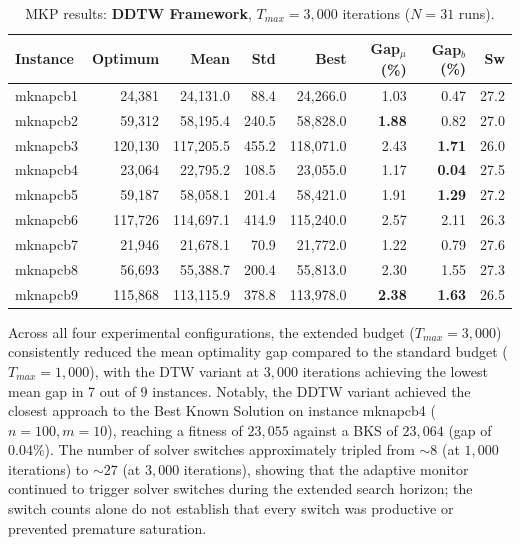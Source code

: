 \documentclass[review]{elsarticle}
\begin{document}
\begin{table}[htbp]
\centering
\caption{MKP results: \textbf{DDTW Framework}, $T_{max} = 3{,}000$ iterations ($N=31$ runs).}
\label{tab:mkp_ddtw_3k}
\begin{tabular}{lrrrrrrr}
\toprule
\textbf{Instance} & \textbf{Optimum} & \textbf{Mean} & \textbf{Std} & \textbf{Best} & \textbf{Gap$_\mu$ (\%)} & \textbf{Gap$_b$ (\%)} & \textbf{Sw} \\
\midrule
mknapcb1 & 24,381 & 24,131.0 & 88.4 & 24,266.0 & 1.03 & 0.47 & 27.2 \\
mknapcb2 & 59,312 & 58,195.4 & 240.5 & 58,828.0 & \textbf{1.88} & 0.82 & 27.0 \\
mknapcb3 & 120,130 & 117,205.5 & 455.2 & 118,071.0 & 2.43 & \textbf{1.71} & 26.0 \\
mknapcb4 & 23,064 & 22,795.2 & 108.5 & 23,055.0 & 1.17 & \textbf{0.04} & 27.5 \\
mknapcb5 & 59,187 & 58,058.1 & 201.4 & 58,421.0 & 1.91 & \textbf{1.29} & 27.2 \\
mknapcb6 & 117,726 & 114,697.1 & 414.9 & 115,240.0 & 2.57 & 2.11 & 26.3 \\
mknapcb7 & 21,946 & 21,678.1 & 70.9 & 21,772.0 & 1.22 & 0.79 & 27.6 \\
mknapcb8 & 56,693 & 55,388.7 & 200.4 & 55,813.0 & 2.30 & 1.55 & 27.3 \\
mknapcb9 & 115,868 & 113,115.9 & 378.8 & 113,978.0 & \textbf{2.38} & \textbf{1.63} & 26.5 \\
\bottomrule
\end{tabular}
\end{table}

Across all four experimental configurations, the extended budget ($T_{max} = 3{,}000$) consistently reduced the mean optimality gap compared to the standard budget ($T_{max} = 1{,}000$), with the DTW variant at $3{,}000$ iterations achieving the lowest mean gap in 7 out of 9 instances. Notably, the DDTW variant achieved the closest approach to the Best Known Solution on instance mknapcb4 ($n=100, m=10$), reaching a fitness of $23{,}055$ against a BKS of $23{,}064$ (gap of $0.04\%$). The number of solver switches approximately tripled from $\sim 8$ (at $1{,}000$ iterations) to $\sim 27$ (at $3{,}000$ iterations), showing that the adaptive monitor continued to trigger solver switches during the extended search horizon; the switch counts alone do not establish that every switch was productive or prevented premature saturation.
\end{document}
